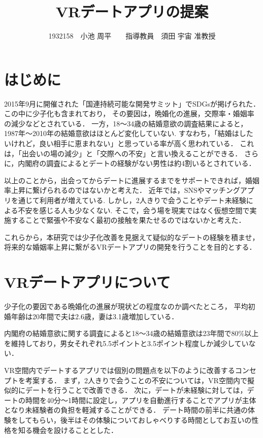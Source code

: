 \documentclass[twocolumn,10pt,a4j]{ltjsarticle}
\title{VRデートアプリの提案}
\author{1932158　小池 周平　　指導教員　須田 宇宙 准教授}
\date{ }
\begin{document}
\maketitle

\section{はじめに}



2015年9月に開催された「国連持続可能な開発サミット」でSDGsが掲げられた．この中に少子化も含まれており，
その要因は，晩婚化の進展\cite{sasaki2012}，交際率・婚姻率の減少\cite{naikakufu2019}などとされている．
一方，18〜34歳の結婚意欲の調査結果によると，1987年〜2010年の結婚意欲はほとんど変化していない.
すなわち，「結婚はしたいけれど，良い相手に恵まれない」と思っている率が高く思われている\cite{naikakufu2019}．
これは，「出会いの場の減少」と「交際への不安」と言い換えることができる．
さらに，内閣府の調査によるとデートの経験がない男性は約4割いるとされている\cite{naikakufu2022}．


以上のことから，出会ってからデートに進展するまでをサポートできれば，婚姻率上昇に繋げられるのではないかと考えた．
近年では，SNSやマッチングアプリを通じて利用者が増えている\cite{cancan}.
しかし，2人きりで会うことやデート未経験による不安を感じる人も少なくない\cite{prtimes,yoshimura2020}.
そこで，会う場を現実ではなく仮想空間で実施することで緊張や不安なく最初の接触を果たせるのではないかと考えた．


これらから，本研究では少子化改善を見据えて疑似的なデートの経験を積ませ，将来的な婚姻率上昇に繋がるVRデートアプリの開発を行うことを目的とする．



\section{VRデートアプリについて}
少子化の要因である晩婚化の進展が現状どの程度なのか調べたところ，
平均初婚年齢は20年間で夫は2.6歳，妻は3.1歳増加している．


内閣府の結婚意欲に関する調査によると18～34歳の結婚意欲は23年間で80\%以上を維持しており，男女それぞれ5.5ポイントと3.5ポイント程度しか減少していない．


VR空間内でデートするアプリでは個別の問題点を以下のように改善するコンセプトを考案する．
まず，2人きりで会うことの不安については，VR空間内で擬似的にデートを行うことで改善できる．
次に，デートが未経験に対しては，デートの時間を40分〜1時間に設定し，アプリを自動進行することでアプリが主体となり未経験者の負担を軽減することができる．
デート時間の前半に共通の体験をしてもらい，後半はその体験についておしゃべりする時間としてお互いの性格を知る機会を設けることとした．
\end{document}
